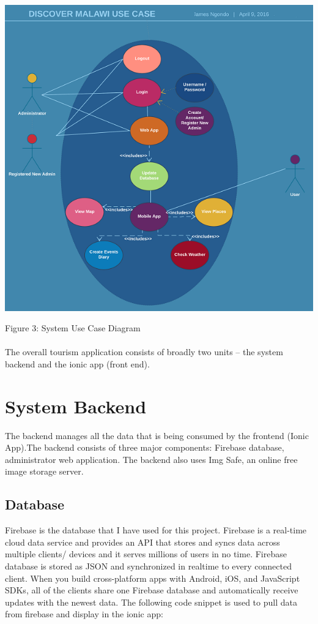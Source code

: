 \paragraph{}
\begin{center}    
	\includegraphics{img/UseCases.png}
\end{center}
\begin{center}
	Figure 3: System Use Case Diagram
\end{center}

\paragraph{}
The overall tourism application consists of broadly two units – the system backend and the ionic app (front end).

\section{System Backend}
The backend manages all the data that is being consumed by the frontend (Ionic App).The backend consists of three major components: Firebase database, administrator web application. The backend also uses Img Safe, an online free image storage server.

\subsection{Database}
Firebase is the database that I have used for this project. Firebase is a real-time cloud data service and provides an API that stores and syncs data across multiple clients/ devices and it serves millions of users in no time. Firebase database is stored as JSON and synchronized in realtime to every connected client. When you build cross-platform apps with Android, iOS, and JavaScript SDKs, all of the clients share one Firebase database and automatically receive updates with the newest data.
The following code snippet is used to pull data from firebase and display in the ionic app:

